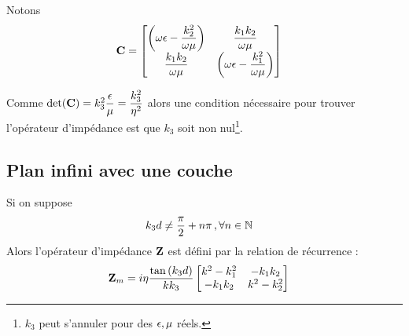 Notons
\begin{align}
    \mathbf{C} &=
    \begin{bmatrix}
        \left(\omega\epsilon-\dfrac{k_2^2}{\omega\mu}\right) & \dfrac{k_1k_2}{\omega\mu}\\
        \dfrac{k_1k_2}{\omega\mu} & \left(\omega\epsilon-\dfrac{k_1^2}{\omega\mu}\right)
    \end{bmatrix}
\end{align}

Comme $\det(\mathbf{C}) = k_3^2\dfrac{\epsilon}{\mu}=\dfrac{k_3^2}{\eta^2}$ alors une condition nécessaire pour trouver l'opérateur d'impédance est que $k_3$ soit non nul\footnote{$k_3$ peut s'annuler pour des $\epsilon,\mu$ réels.}.


\subsection{Plan infini avec une couche}

\begin{thm}
    Si on suppose
        \begin{align}
        k_3d &\not = \dfrac{\pi}{2}+n\pi\,, \forall n \in \mathbb N
    \end{align}
    Alors l'opérateur d'impédance $\mathbf{Z}$ est défini par la relation de récurrence : 
    \begin{align}
    \mathbf{Z}_m &= i\eta\dfrac{\tan\left(k_3d\right)}{kk_3}
        \begin{bmatrix}
           k^2-k_1^2  & -k_1k_2\\
            -k_1k_2 & k^2-k_2^2\\
        \end{bmatrix}
    \end{align}
\end{thm}

